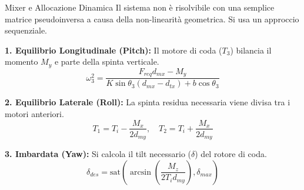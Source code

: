 \documentclass[demo]{beamer} %
\begin{document}
\begin{frame}{Mixer e Allocazione Dinamica}
    Il sistema non è risolvibile con una semplice matrice pseudoinversa a causa della non-linearità geometrica. Si usa un approccio sequenziale.
    
    \vspace{0.5em}
    \textbf{1. Equilibrio Longitudinale (Pitch):}
    Il motore di coda ($T_3$) bilancia il momento $M_y$ e parte della spinta verticale.
    \begin{equation}
        \omega_3^2 = \frac{F_{req} d_{mx} - M_y}{K \sin\theta_3 (d_{mx} - d_{tx}) + b \cos\theta_3}
    \end{equation}
    
    \textbf{2. Equilibrio Laterale (Roll):}
    La spinta residua necessaria viene divisa tra i motori anteriori.
    \begin{equation}
        T_1 = T_i - \frac{M_x}{2 d_{my}}, \quad T_2 = T_i + \frac{M_x}{2 d_{my}}
    \end{equation}
    
    \textbf{3. Imbardata (Yaw):}
    Si calcola il tilt necessario ($\delta$) del rotore di coda.
    \begin{equation}
        \delta_{des} = \text{sat}\left( \arcsin\left( \frac{M_z}{2 T_i d_{my}} \right), \delta_{max} \right)
    \end{equation}
\end{frame}
\end{document}
